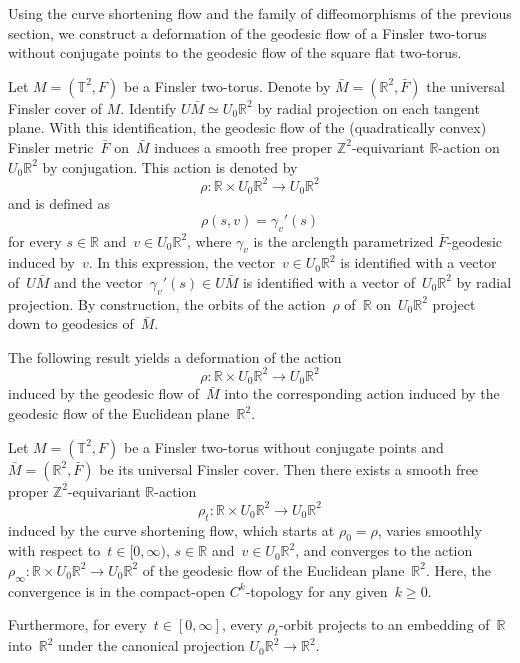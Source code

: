 \documentclass[AHL,Unicode,longabstracts,published]{cedram}
\newcommand{\Z}{\mathbb{Z}}
\newcommand{\R}{\mathbb{R}}
\newcommand{\T}{\mathbb{T}}
\begin{document}
Using the curve shortening flow and the family of diffeomorphisms of the previous section, we construct a deformation of the geodesic flow of a Finsler two-torus without conjugate points to the geodesic flow of the square flat two-torus.

Let $M=(\T^2,F)$ be a Finsler two-torus. Denote by $\bar{M}=(\R^2,\bar{F})$ the universal Finsler cover of $M$. Identify $U\bar{M} \simeq U_0\R^2$ by radial projection on each tangent plane. With this identification, the geodesic flow of the (quadratically convex) Finsler metric~$\bar{F}$ on~$\bar{M}$ induces a smooth free proper $\Z^2$-equivariant $\R$-action on~$U_0\R^2$ by conjugation. This action is denoted by
\[
\rho:\R \times U_0\R^2 \to U_0\R^2
\]
and is defined as
\[
\rho(s,v) = \gamma_v'(s)
\]
for every $s \in \R$ and~$v \in U_0\R^2$, where $\gamma_v$ is the arclength parametrized $\bar{F}$-geodesic induced by~$v$. In this expression, the vector~$v \in U_0\R^2$ is identified with a vector of~$U\bar{M}$ and the vector~$\gamma_v'(s) \in U\bar{M}$ is identified with a vector of~$U_0\R^2$ by radial projection. By construction, the orbits of the action~$\rho$ of~$\R$ on~$U_0\R^2$ project down to geodesics of~$\bar{M}$. 

The following result yields a deformation of the action
\[
\rho:\R \times U_0\R^2 \to U_0\R^2
\]
induced by the geodesic flow of~$\bar{M}$ into the corresponding action induced by the geodesic flow of the Euclidean plane~$\R^2$.

\begin{theo}\label{theo:convergence}
Let $M=(\T^2,F)$ be a Finsler two-torus without conjugate points and $\bar{M}=(\R^2,\bar{F})$ be its universal Finsler cover. Then there exists a smooth free proper $\Z^2$-equivariant $\R$-action
\[
\rho_t:\R \times U_0\R^2 \to U_0\R^2
\]
induced by the curve shortening flow, which starts at $\rho_{0}=\rho$, varies smoothly with respect to~$t \in [0,\infty)$, $s \in \R$ and~$v \in U_0\R^2$, and converges to the action $\rho_\infty:\R \times U_0\R^2 \to U_0\R^2$ of the geodesic flow of the Euclidean plane~$\R^2$. Here, the convergence is in the compact-open $C^k$-topology for any given~\mbox{$k \geq 0$}.

Furthermore, for every~$t \in [0,\infty]$, every $\rho_t$-orbit projects to an embedding of~$\R$ into~$\R^2$ under the canonical projection $U_0\R^2 \to \R^2$.
\end{theo}
\end{document}
